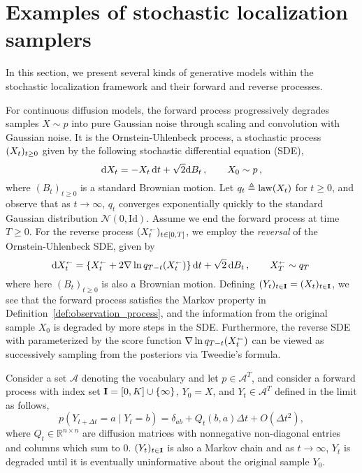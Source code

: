 \section{Examples of stochastic localization samplers}\label{app:ex_stocloc}
In this section, we present several kinds of generative models within the stochastic localization framework and their forward and reverse processes.  \begin{example} For continuous diffusion models, the forward process progressively degrades samples $X \sim p$ into pure Gaussian noise through scaling and convolution with Gaussian noise. It is the Ornstein-Uhlenbeck process, a stochastic process $(X_t)_{t\ge 0}$ given by the following stochastic differential equation (SDE),
\begin{equation}
    \mathrm{d}X_t = -X_t\,\mathrm{d} t + \sqrt{2}\mathrm{d} B_t\,, \qquad X_0 \sim p\,, \label{eq:forward}
\end{equation}
where $(B_t)_{t\ge 0}$ is a standard Brownian motion. Let $q_t \triangleq \mathrm{law}(X_t)$ for $t \geq 0$, and observe that as $t\to \infty$, $q_t$ converges exponentially quickly to the standard Gaussian distribution $\mathcal{N}(0,\mathrm{Id})$. Assume we end the forward process at time $T \ge 0.$ For the reverse process $(X^{\scriptscriptstyle\leftarrow}_t)_{t\in[0,T]}$, we employ the \emph{reversal} of the Ornstein-Uhlenbeck SDE, given by  
\begin{equation}
    \mathrm{d}X^{\scriptscriptstyle\leftarrow}_t = \{X^{\scriptscriptstyle\leftarrow}_t + 2\nabla\ln q_{T-t}(X^{\scriptscriptstyle\leftarrow}_t)\}\,\mathrm{d} t + \sqrt{2}\,\mathrm{d} B_t\,,\qquad X^{\scriptscriptstyle\leftarrow}_T \sim q_T\, \label{eq:reverse}
\end{equation}
where here $(B_t)_{t\ge 0}$ is also a Brownian motion. Defining $(Y_t)_{t \in \mathbf{I}}=(X_t)_{t \in \mathbf{I}}$, we see that the forward process satisfies the Markov property in  Definition~\ref{def:observation_process}, and the information from the original sample $X_0$ is degraded by more steps in the SDE. Furthermore, the reverse SDE with parameterized by the score function $\nabla \ln q_{T-t}(X^{\scriptscriptstyle\leftarrow}_t)$ can be viewed as successively sampling from the posteriors via Tweedie's formula.  
\end{example}
\begin{example} Consider a set $\mathcal{A}$ denoting the vocabulary and let $p \in \mathcal{A}^T$, and consider a forward process with index set $\mathbf{I}=[0,K]\cup \{\infty\}$, $Y_0=X$, and $Y_t \in \mathcal{A}^T$ defined in the limit as follows,
\[p(Y_{t+\Delta t} = a \mid Y_t = b) = \delta_{ab} + Q_t(b, a) \Delta t + O(\Delta t^2) \tag{2},\]
where $Q_t \in \mathbb{R}^{n \times n}$ are diffusion matrices with nonnegative non-diagonal entries and columns which sum to $0$. $(Y_t)_{t \in \mathbf{I}}$ is also a Markov chain and as $t \to \infty$, $Y_t$ is degraded until it is eventually uninformative about the original sample $Y_0$.  
\end{example}

